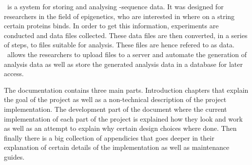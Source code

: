 \appName\ is a system for storing and analysing -sequence data. It was designed for researchers in the field of epigenetics, who are interested in where on a  string certain proteins binds. In order to get this information, experiments are conducted and  data files collected. These data files are then converted, in a series of steps, to files suitable for analysis. These files are hence refered to as  data. \appName\ allows the researchers to upload  files to a server and automate the generation of analysis data as well as store the generated analysis data in a database for later access. 

The documentation contains three main parts. Introduction chapters that explain the goal of the project as well as a non-technical description of the project implementation. The development part of the document where the current implementation of each part of the project is explained how they look and work as well as an attempt to explain why certain design choices where done. Then finally there is a big collection of appendicies that goes deeper in their explanation of certain details of the implementation as well as maintenance guides.

